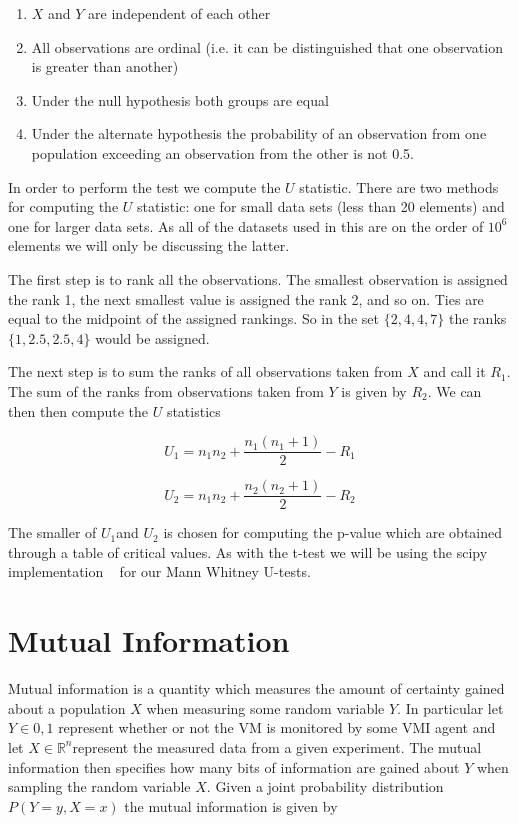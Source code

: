 \begin{enumerate}
	\item $X$ and $Y$ are independent of each other
	\item All observations are ordinal (i.e. it can be distinguished that one observation is greater than another) 
	\item Under the null hypothesis both groups are equal
	\item Under the alternate hypothesis the probability of an observation from one population exceeding an observation from the other is not 0.5. 
\end{enumerate}

In order to perform the test we compute the $U$ statistic.  There are two methods for computing the $U$ statistic: one for small data sets (less than 20 elements) and one for larger data sets.  As all of the datasets used in this are on the order of $10^6$ elements we will only be discussing the latter.

The first step is to rank all the observations. The smallest observation is assigned the rank 1, the next smallest value is assigned the rank 2, and so on.  Ties are equal to the midpoint of the assigned rankings. So in the set $\{2,4,4,7\}$ the ranks $\{1, 2.5, 2.5, 4\}$ would be assigned. 

The next step is to sum the ranks of all observations taken from $X$ and call it $R_1$.  The sum of the ranks from observations taken from $Y$ is given by $R_2$. We can then then compute the $U$ statistics 

\begin{equation}\label{U1}
	U_1=n_1 n_2 + \frac{n_1(n_1+1)}{2} - R_1
\end{equation}

\begin{equation}\label{U2}
	U_2=n_1 n_2 + \frac{n_2(n_2+1)}{2} - R_2
\end{equation}

The smaller of $U_1$and $U_2$ is chosen for computing the p-value which are obtained through a table of critical values. As with the t-test we will be using the scipy implementation ~\cite{jones_scipy:_2001} for our Mann Whitney U-tests. 

\section{Mutual Information}

Mutual information is a quantity which measures the amount of certainty gained about a population $X$ when measuring some random variable $Y$.  In particular let $Y\in {0,1}$ represent whether or not the VM is monitored by some VMI agent and let $X\in \mathbb{R}^n $represent the measured data from a given experiment.  The mutual information   then specifies how many bits of information are gained about $Y$ when sampling the random variable $X$.  Given a joint probability distribution $P(Y=y,X=x)$  the mutual information is given by 

